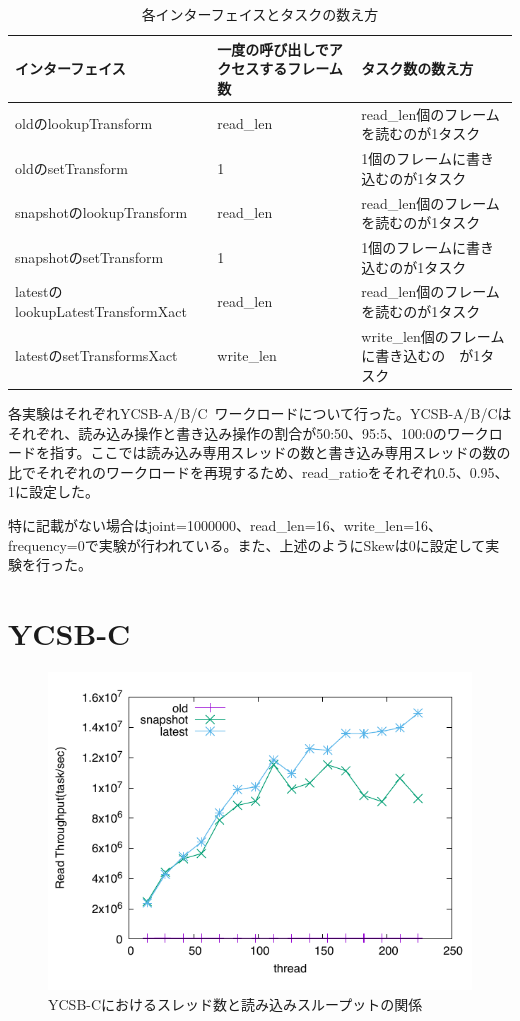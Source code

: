 \documentclass[a4paper]{jreport}	%
\begin{document}
\begin{table}[ht]
\centering
\begin{tabular}[t]{ | m{5cm} | m{5cm} | m{5cm} |}
\hline
インターフェイス & 一度の呼び出しでアクセスするフレーム数 & タスク数の数え方 \\
\hline
oldのlookupTransform & read\_len & read\_len個のフレームを読むのが1タスク \\
oldのsetTransform & 1 & 1個のフレームに書き込むのが1タスク \\
snapshotのlookupTransform& read\_len & read\_len個のフレームを読むのが1タスク \\
snapshotのsetTransform& 1 & 1個のフレームに書き込むのが1タスク \\
latestのlookupLatestTransformXact& read\_len & read\_len個のフレームを読むのが1タスク \\
latestのsetTransformsXact& write\_len & write\_len個のフレームに書き込むの　が1タスク \\
\hline
\end{tabular}
\caption{各インターフェイスとタスクの数え方}
\label{table:task-count-method}
\end{table}%


各実験はそれぞれYCSB-A/B/C~\cite{ycsb}ワークロードについて行った。YCSB-A/B/Cはそれぞれ、読み込み操作と書き込み操作の割合が50:50、95:5、100:0のワークロードを指す。ここでは読み込み専用スレッドの数と書き込み専用スレッドの数の比でそれぞれのワークロードを再現するため、read\_ratioをそれぞれ0.5、0.95、1に設定した。

特に記載がない場合はjoint=1000000、read\_len=16、write\_len=16、frequency=0で実験が行われている。また、上述のようにSkewは0に設定して実験を行った。

\section{YCSB-C}

\begin{figure}[h] 
\centering
\includegraphics[width=15cm]{ycsb-c/opposite-read-throughput}
\caption{YCSB-Cにおけるスレッド数と読み込みスループットの関係}
\label{fig:throughput-c}
\end{figure}
\end{document}
